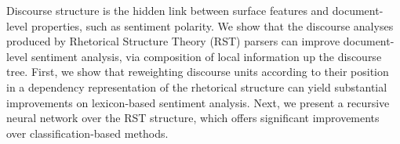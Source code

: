 Discourse structure is the hidden link between surface features and document-level properties, such as sentiment polarity. We show that the discourse analyses produced by Rhetorical Structure Theory (RST) parsers can improve document-level sentiment analysis, via composition of local information up the discourse tree. First, we show that reweighting discourse units according to their position in a dependency representation of the rhetorical structure can yield substantial improvements on lexicon-based sentiment analysis. Next, we present a recursive neural network over the RST structure, which offers significant improvements over classification-based methods.
